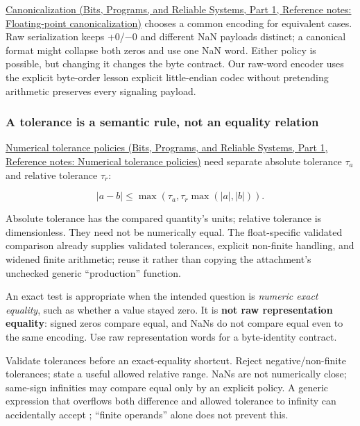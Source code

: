 \href{../01-Bits-Programs-and-Reliable-Systems-P01/main.pdf\#appendix-e90053a4b201}{Canonicalization (Bits, Programs, and Reliable Systems, Part 1, Reference notes: Floating-point canonicalization)} chooses a common encoding for equivalent cases. Raw serialization keeps +0/−0 and different NaN payloads distinct; a canonical format might collapse both zeros and use one NaN word. Either policy is possible, but changing it changes the byte contract. Our raw-word encoder uses the explicit byte-order lesson explicit little-endian codec without pretending arithmetic preserves every signaling payload.

\subsubsection{A tolerance is a semantic rule, not an equality relation}\label{05-engine-i-ch001-a-tolerance-is-a-semantic-rule-not-an-equality-relation}

\hypertarget{05-engine-i-ch001-a-tolerance-is-a-semantic-rule-not-an-equality-relation}{}

\href{../01-Bits-Programs-and-Reliable-Systems-P01/main.pdf\#appendix-0ec599f8ba27}{Numerical tolerance policies (Bits, Programs, and Reliable Systems, Part 1, Reference notes: Numerical tolerance policies)} need separate absolute tolerance \(\tau_a\) and relative tolerance \(\tau_r\):

\[
|a-b|\le\max\!\left(\tau_a,\tau_r\max(|a|,|b|)\right).
\]

Absolute tolerance has the compared quantity's units; relative tolerance is dimensionless. They need not be numerically equal. The float-specific validated comparison already supplies validated tolerances, explicit non-finite handling, and widened finite arithmetic; reuse it rather than copying the attachment's unchecked generic ``production'' function.

An exact \BookInlineCode{{=}{=}}{==} test is appropriate when the intended question is \emph{numeric exact equality}, such as whether a value stayed zero. It is \textbf{not raw representation equality}: signed zeros compare equal, and NaNs do not compare equal even to the same encoding. Use raw representation words for a byte-identity contract.

Validate tolerances before an exact-equality shortcut. Reject negative/non-finite tolerances; state a useful allowed relative range. NaNs are not numerically close; same-sign infinities may compare equal only by an explicit policy. A generic expression that overflows both difference and allowed tolerance to infinity can accidentally accept ; ``finite operands'' alone does not prevent this.

